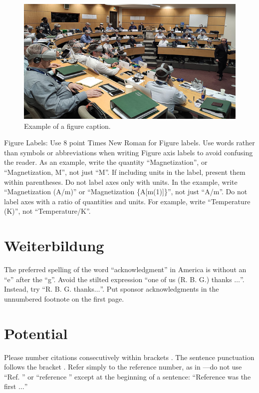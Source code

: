 \documentclass[conference]{IEEEtran}
\begin{document}
\begin{figure}[htbp]
\centerline{\includegraphics[scale=0.4]{img/fig2.jpg}}
\caption{Example of a figure caption.}
\label{fig}
\end{figure}

Figure Labels: Use 8 point Times New Roman for Figure labels. Use words 
rather than symbols or abbreviations when writing Figure axis labels to 
avoid confusing the reader. As an example, write the quantity 
``Magnetization'', or ``Magnetization, M'', not just ``M''. If including 
units in the label, present them within parentheses. Do not label axes only 
with units. In the example, write ``Magnetization (A/m)'' or ``Magnetization 
\{A[m(1)]\}'', not just ``A/m''. Do not label axes with a ratio of 
quantities and units. For example, write ``Temperature (K)'', not 
``Temperature/K''.

\section{Weiterbildung}

The preferred spelling of the word ``acknowledgment'' in America is without 
an ``e'' after the ``g''. Avoid the stilted expression ``one of us (R. B. 
G.) thanks $\ldots$''. Instead, try ``R. B. G. thanks$\ldots$''. Put sponsor 
acknowledgments in the unnumbered footnote on the first page.

\section{Potential}

Please number citations consecutively within brackets \cite{b1}. The 
sentence punctuation follows the bracket \cite{b2}. Refer simply to the reference 
number, as in \cite{b3}---do not use ``Ref. \cite{b3}'' or ``reference \cite{b3}'' except at 
the beginning of a sentence: ``Reference \cite{b3} was the first $\ldots$''
\end{document}
